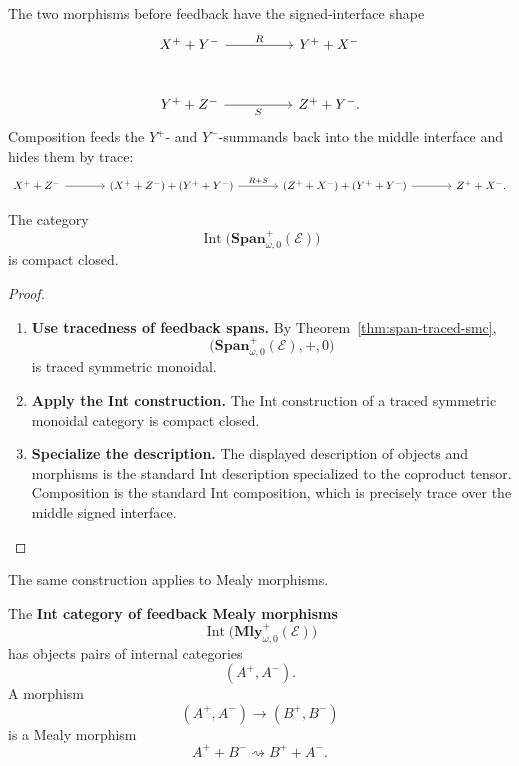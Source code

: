 The two morphisms before feedback have the signed-interface shape
\[
\begin{tikzcd}[column sep=huge,row sep=large]
  X^+ + Y^-
    \ar[r,"R"]
  &
  Y^+ + X^-
  \\
  Y^+ + Z^-
    \ar[r,"S"']
  &
  Z^+ + Y^- .
\end{tikzcd}
\]
Composition feeds the \(Y^+\)- and \(Y^-\)-summands back into the middle
interface and hides them by trace:
\[
\begin{tikzcd}[column sep=large,row sep=large]
  X^+ + Z^-
    \ar[r]
  &
  (X^+ + Z^-)+(Y^+ + Y^-)
    \ar[r,"R+S"]
  &
  (Z^+ + X^-)+(Y^+ + Y^-)
    \ar[r]
  &
  Z^+ + X^- .
\end{tikzcd}
\]

\begin{theorem}
\label{thm:int-feedback-spans}
The category
\[
  \operatorname{Int}
  \bigl(
    \mathbf{Span}^{+}_{\omega,0}(\mathcal E)
  \bigr)
\]
is compact closed.
\end{theorem}

\begin{proof}
\begin{enumerate}
  \item \textbf{Use tracedness of feedback spans.}
  By Theorem~\ref{thm:span-traced-smc},
  \[
    \bigl(\mathbf{Span}^{+}_{\omega,0}(\mathcal E),+,0\bigr)
  \]
  is traced symmetric monoidal.

  \item \textbf{Apply the Int construction.}
  The Int construction of a traced symmetric monoidal category is compact
  closed.

  \item \textbf{Specialize the description.}
  The displayed description of objects and morphisms is the standard Int
  description specialized to the coproduct tensor. Composition is the standard
  Int composition, which is precisely trace over the middle signed interface.
\end{enumerate}
\end{proof}

The same construction applies to Mealy morphisms.

\begin{definition}
\label{def:int-feedback-mealy}
The \textbf{Int category of feedback Mealy morphisms}
\[
  \operatorname{Int}
  \bigl(
    \mathbf{Mly}^{+}_{\omega,0}(\mathcal E)
  \bigr)
\]
has objects pairs of internal categories
\[
  (A^+,A^-).
\]
A morphism
\[
  (A^+,A^-)\longrightarrow(B^+,B^-)
\]
is a Mealy morphism
\[
  A^+ + B^-
  \rightsquigarrow
  B^+ + A^-.
\]
\end{definition}

